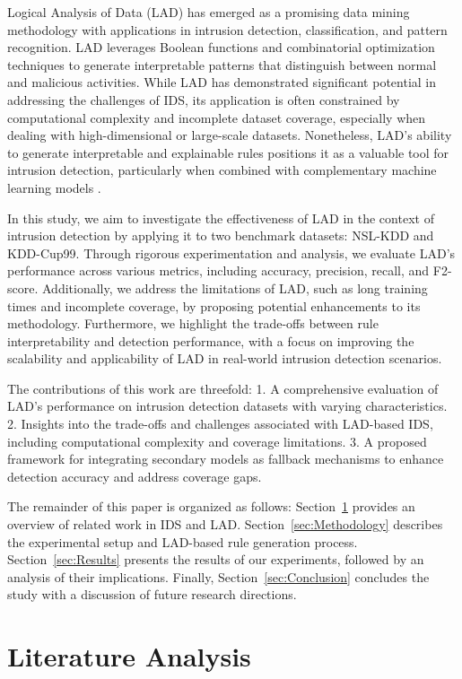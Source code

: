 \documentclass[pdflatex,sn-mathphys-num]{sn-jnl}%
\theoremstyle{thmstyleone}%
\theoremstyle{thmstyletwo}%
\theoremstyle{thmstylethree}%
\begin{document}
Logical Analysis of Data (LAD) has emerged as a promising data mining methodology with applications in intrusion detection, classification, and pattern recognition. LAD leverages Boolean functions and combinatorial optimization techniques to generate interpretable patterns that distinguish between normal and malicious activities. While LAD has demonstrated significant potential in addressing the challenges of IDS, its application is often constrained by computational complexity and incomplete dataset coverage, especially when dealing with high-dimensional or large-scale datasets. Nonetheless, LAD's ability to generate interpretable and explainable rules positions it as a valuable tool for intrusion detection, particularly when combined with complementary machine learning models \cite{LAD1, LAD2}.

In this study, we aim to investigate the effectiveness of LAD in the context of intrusion detection by applying it to two benchmark datasets: NSL-KDD and KDD-Cup99. Through rigorous experimentation and analysis, we evaluate LAD's performance across various metrics, including accuracy, precision, recall, and F2-score. Additionally, we address the limitations of LAD, such as long training times and incomplete coverage, by proposing potential enhancements to its methodology. Furthermore, we highlight the trade-offs between rule interpretability and detection performance, with a focus on improving the scalability and applicability of LAD in real-world intrusion detection scenarios.

The contributions of this work are threefold: 
1. A comprehensive evaluation of LAD's performance on intrusion detection datasets with varying characteristics.
2. Insights into the trade-offs and challenges associated with LAD-based IDS, including computational complexity and coverage limitations.
3. A proposed framework for integrating secondary models as fallback mechanisms to enhance detection accuracy and address coverage gaps.

The remainder of this paper is organized as follows: Section~\ref{sec:Review} provides an overview of related work in IDS and LAD. Section~\ref{sec:Methodology} describes the experimental setup and LAD-based rule generation process. Section~\ref{sec:Results} presents the results of our experiments, followed by an analysis of their implications. Finally, Section~\ref{sec:Conclusion} concludes the study with a discussion of future research directions.

\section{Literature Analysis} \label{sec:Review}
\end{document}
